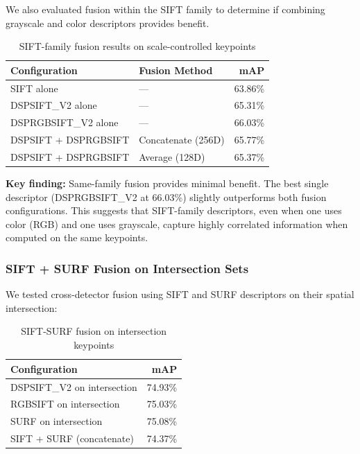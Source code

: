 We also evaluated fusion within the SIFT family to determine if combining grayscale and color descriptors provides benefit.

\begin{table}[ht]
\centering
\caption{SIFT-family fusion results on scale-controlled keypoints}
\label{tab:sift_family_fusion}
\begin{tabular}{llr}
\toprule
\textbf{Configuration} & \textbf{Fusion Method} & \textbf{mAP} \\
\midrule
SIFT alone & --- & 63.86\% \\
DSPSIFT\_V2 alone & --- & 65.31\% \\
DSPRGBSIFT\_V2 alone & --- & 66.03\% \\
\midrule
DSPSIFT + DSPRGBSIFT & Concatenate (256D) & 65.77\% \\
DSPSIFT + DSPRGBSIFT & Average (128D) & 65.37\% \\
\bottomrule
\end{tabular}
\end{table}

\textbf{Key finding:} Same-family fusion provides minimal benefit. The best single descriptor (DSPRGBSIFT\_V2 at 66.03\%) slightly outperforms both fusion configurations. This suggests that SIFT-family descriptors, even when one uses color (RGB) and one uses grayscale, capture highly correlated information when computed on the same keypoints.

\subsubsection{SIFT + SURF Fusion on Intersection Sets}

We tested cross-detector fusion using SIFT and SURF descriptors on their spatial intersection:

\begin{table}[ht]
\centering
\caption{SIFT-SURF fusion on intersection keypoints}
\label{tab:sift_surf_fusion}
\begin{tabular}{lr}
\toprule
\textbf{Configuration} & \textbf{mAP} \\
\midrule
DSPSIFT\_V2 on intersection & 74.93\% \\
RGBSIFT on intersection & 75.03\% \\
SURF on intersection & 75.08\% \\
\midrule
SIFT + SURF (concatenate) & 74.37\% \\
\bottomrule
\end{tabular}
\end{table}

